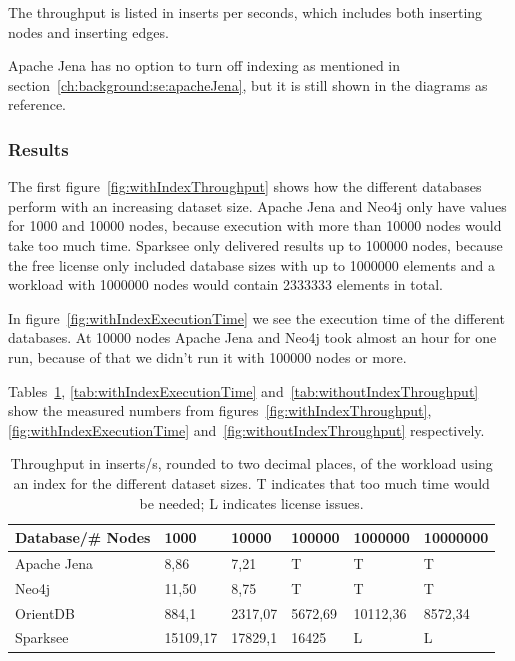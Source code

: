 The throughput is listed in inserts per seconds,
which includes both inserting nodes and inserting edges.

Apache Jena has no option to turn off indexing as mentioned in section~\ref{ch:background:se:apacheJena},
but it is still shown in the diagrams as reference.

\subsubsection{Results}
The first figure~\ref{fig:withIndexThroughput} shows how the different databases perform with an increasing dataset size.
Apache Jena and Neo4j only have values for 1000 and 10000 nodes,
because execution with more than 10000 nodes would take too much time.
Sparksee only delivered results up to 100000 nodes,
because the free license only included database sizes with up to 1000000 elements and a workload with 1000000 nodes would contain 2333333 elements in total.

In figure~\ref{fig:withIndexExecutionTime} we see the execution time of the different databases.
At 10000 nodes Apache Jena and Neo4j took almost an hour for one run,
because of that we didn't run it with 100000 nodes or more.

Tables~\ref{tab:withIndexThroughput},
\ref{tab:withIndexExecutionTime} and~\ref{tab:withoutIndexThroughput} show the measured numbers from figures~\ref{fig:withIndexThroughput},
\ref{fig:withIndexExecutionTime} and~\ref{fig:withoutIndexThroughput} respectively.

\begin{table}[h!]
  \begin{minipage}{\textwidth}
    \centering
    \begin{tabularx}{\textwidth}{ | l | X | X | X | X | X | }
      \hline
      Database/\# Nodes & 1000 & 10000 & 100000 & 1000000 & 10000000 \\ \hline
      Apache Jena & 8,86 & 7,21 & T & T & T \\ \hline
      Neo4j & 11,50 & 8,75 & T & T & T \\ \hline
      OrientDB & 884,1 & 2317,07 & 5672,69 & 10112,36 & 8572,34 \\ \hline
      Sparksee & 15109,17 & 17829,1 & 16425 & L & L \\ \hline
    \end{tabularx}
  \end{minipage}
  \caption{Throughput in inserts/s, rounded to two decimal places, of the workload using an index for the different dataset sizes. T indicates that too much time would be needed; L indicates license issues.}
  \label{tab:withIndexThroughput}
\end{table}

